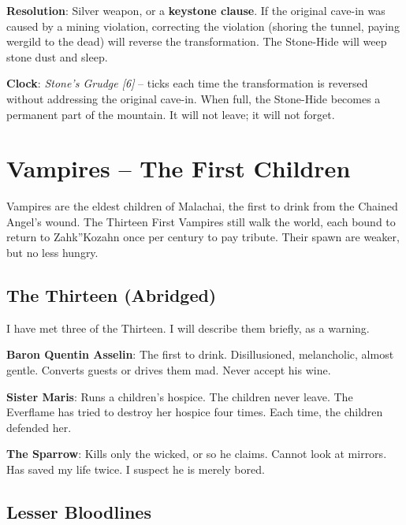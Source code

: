\noindent\textbf{Resolution}: Silver weapon, or a \textbf{keystone clause}. If the original cave-in was caused by a mining violation, correcting the violation (shoring the tunnel, paying wergild to the dead) will reverse the transformation. The Stone-Hide will weep stone dust and sleep.

\noindent\textbf{Clock}: \emph{Stone's Grudge [6]} -- ticks each time the transformation is reversed without addressing the original cave-in. When full, the Stone-Hide becomes a permanent part of the mountain. It will not leave; it will not forget.


\section*{Vampires -- The First Children}

\noindent Vampires are the eldest children of Malachai, the first to drink from the Chained Angel's wound. The Thirteen First Vampires still walk the world, each bound to return to Zahk''Kozahn once per century to pay tribute. Their spawn are weaker, but no less hungry.

\subsection*{The Thirteen (Abridged)}

I have met three of the Thirteen. I will describe them briefly, as a warning.

\noindent\textbf{Baron Quentin Asselin}: The first to drink. Disillusioned, melancholic, almost gentle. Converts guests or drives them mad. Never accept his wine.

\noindent\textbf{Sister Maris}: Runs a children's hospice. The children never leave. The Everflame has tried to destroy her hospice four times. Each time, the children defended her.

\noindent\textbf{The Sparrow}: Kills only the wicked, or so he claims. Cannot look at mirrors. Has saved my life twice. I suspect he is merely bored.


\subsection*{Lesser Bloodlines}

